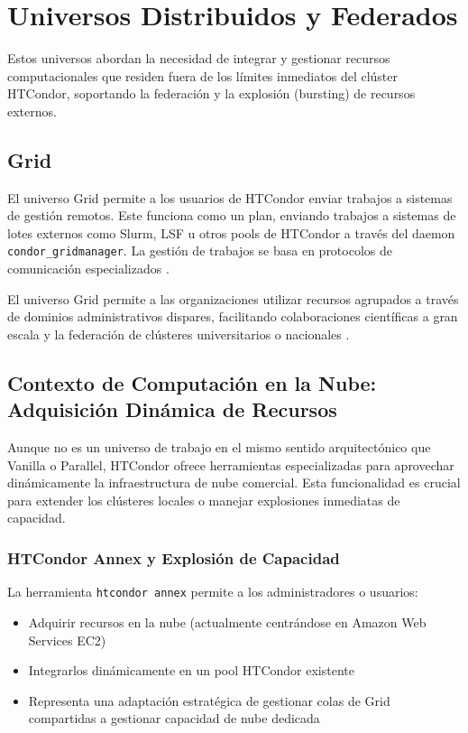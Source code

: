 \section{Universos Distribuidos y Federados}

Estos universos abordan la necesidad de integrar y gestionar recursos computacionales que residen fuera de los límites inmediatos del clúster HTCondor, soportando la federación y la explosión (bursting) de recursos externos.

\subsection{Grid}

El universo Grid permite a los usuarios de HTCondor enviar trabajos a sistemas de gestión remotos. Este funciona como un plan, enviando trabajos a sistemas de lotes externos como Slurm, LSF u otros pools de HTCondor a través del daemon \texttt{condor\_gridmanager}. La gestión de trabajos se basa en protocolos de comunicación especializados \citep{HTCondor-Grid-universe}.

El universo Grid permite a las organizaciones utilizar recursos agrupados a través de dominios administrativos dispares, facilitando colaboraciones científicas a gran escala y la federación de clústeres universitarios o nacionales \citep{Padmanabhan2011}.

\subsection{Contexto de Computación en la Nube: Adquisición Dinámica de Recursos}

Aunque no es un universo de trabajo en el mismo sentido arquitectónico que Vanilla o Parallel, HTCondor ofrece herramientas especializadas para aprovechar dinámicamente la infraestructura de nube comercial. Esta funcionalidad es crucial para extender los clústeres locales o manejar explosiones inmediatas de capacidad.

\subsubsection{HTCondor Annex y Explosión de Capacidad}

La herramienta \texttt{htcondor annex} permite a los administradores o usuarios:

\begin{itemize}
	\item Adquirir recursos en la nube (actualmente centrándose en Amazon Web Services EC2)
	\item Integrarlos dinámicamente en un pool HTCondor existente
	\item Representa una adaptación estratégica de gestionar colas de Grid compartidas a gestionar capacidad de nube dedicada
\end{itemize}


